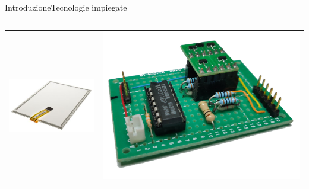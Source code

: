 \documentclass[10pt,aspectratio=169
	]{beamer}
\begin{document}
\begin{frame}{Introduzione}{Tecnologie impiegate}
\begin{columns}
\begin{tabulary}{\linewidth}{CC}
  \includegraphics[height=0.3\textheight]{images/3.jpg}
  &
  \hspace{0cm}
  \includegraphics[height=0.3\textheight]{images/4.jpg}
 \end{tabulary}

	\end{columns}
	\end{frame}
	
\end{document}
